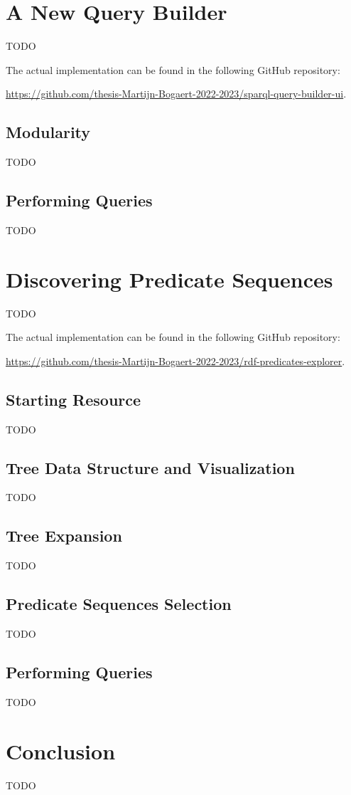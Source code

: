 \section{A New Query Builder}
\label{sec:new_query_builder}

TODO

The actual implementation can be found in the following GitHub repository:
\begin{center}
    \url{https://github.com/thesis-Martijn-Bogaert-2022-2023/sparql-query-builder-ui}.
\end{center}

\subsection{Modularity}

TODO

\subsection{Performing Queries}

TODO

\section{Discovering Predicate Sequences}
\label{sec:discovering_predicate_sequences}

TODO

The actual implementation can be found in the following GitHub repository:
\begin{center}
    \url{https://github.com/thesis-Martijn-Bogaert-2022-2023/rdf-predicates-explorer}.
\end{center}

\subsection{Starting Resource}

TODO

\subsection{Tree Data Structure and Visualization}

TODO

\subsection{Tree Expansion}

TODO

\subsection{Predicate Sequences Selection}

TODO

\subsection{Performing Queries}

TODO

\section{Conclusion}

TODO